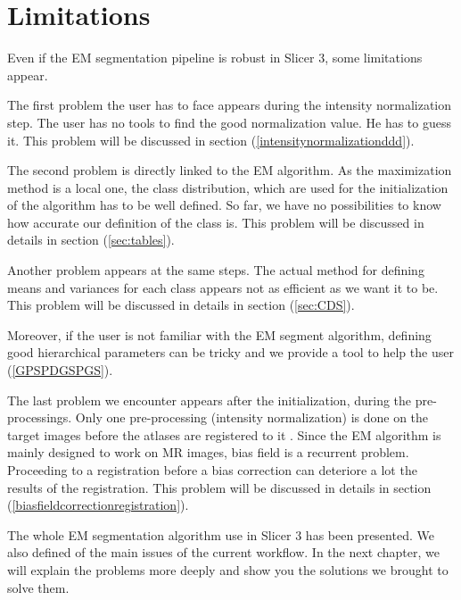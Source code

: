 \section{Limitations}\label{su:limitations}
Even if the EM segmentation pipeline is robust in Slicer 3, some limitations appear.
\par
The first problem the user has to face appears during the intensity normalization step. The user has no tools to find the good normalization value. He has to guess it. This problem will be discussed in section (\ref{intensitynormalizationddd}).
\par
The second problem is directly linked to the EM algorithm. As the maximization method is a local one, the class distribution, which are used for the initialization of the algorithm has to be well defined. So far, we have no possibilities to know how accurate our definition of the class is. This problem will be discussed in details in section (\ref{sec:tables}).
\par
Another problem appears at the same steps. The actual method for defining means and variances for each class appears not as efficient as we want it to be. This problem will be discussed in details in section (\ref{sec:CDS}).
\par
Moreover, if the user is not familiar with the EM segment algorithm, defining good hierarchical parameters can be tricky and we provide a tool to help the user (\ref{GPSPDGSPGS}).
\par 
The last problem we encounter appears after the initialization, during the pre-processings. Only one pre-processing (intensity normalization) is done on the target images before the atlases are registered to it . Since the EM algorithm is mainly designed to work on MR images, bias field is a recurrent problem. Proceeding to a registration before a bias correction can deteriore a lot the results of the registration. This problem will be discussed in details in section (\ref{biasfieldcorrectionregistration}).

%
\par
The whole EM segmentation algorithm use in Slicer 3 has been presented. We also defined of the main issues of the current workflow. In the next chapter, we will explain the problems more deeply and show you the solutions we brought to solve them.
